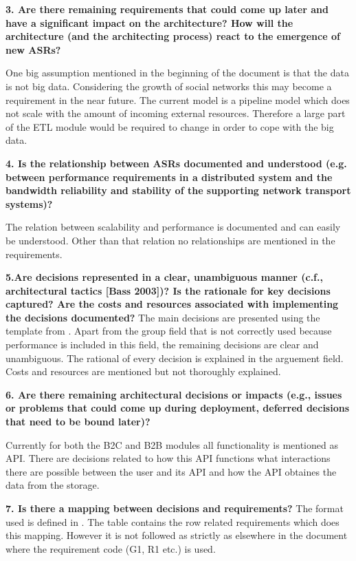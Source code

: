\vspace{.5cm}
\textbf {3. Are there remaining requirements that could come up later and have a significant impact on the architecture? How will the architecture (and the architecting process) react to the emergence of new ASRs? }

One big assumption mentioned in the beginning of the document is that the data is not big data. Considering the growth of social networks this may become a requirement in the near future. The current model is a pipeline model which does not scale with the amount of incoming external resources. Therefore a large part of the ETL module would be required to change in order to cope with the big data. 

\vspace{.5cm}
\textbf {4. Is the relationship between ASRs documented and understood (e.g. between performance requirements in a distributed system and the bandwidth reliability and stability of the supporting network transport systems)?}

The relation between scalability and performance is documented and can easily be understood. Other than that relation no relationships are mentioned in the requirements. 

\vspace{.5cm}
\textbf{5.Are decisions represented in a clear, unambiguous manner (c.f., architectural tactics [Bass 2003])? 
         Is the rationale for key decisions captured?
         Are the costs and resources associated with implementing the decisions documented?}
The main decisions are presented using the template from \cite{}. Apart from the group field that is not correctly used because performance is included in this field, the remaining decisions are clear and unambiguous. The rational of every decision is explained in the arguement field. Costs and resources are mentioned but not thoroughly explained.

\vspace{.5cm}
\textbf {6. Are there remaining architectural decisions or impacts (e.g., issues or problems that could come up during deployment, deferred decisions that need to be bound later)?}

Currently for both the B2C and B2B modules all functionality is mentioned as API. There are decisions related to how this API functions what interactions there are possible between the user and its API and how the API obtaines the data from the storage.

\vspace{.5cm}
\textbf{7. Is there a mapping between decisions and requirements? }
The format used is defined in \cite{tyree}. The table contains the row related requirements which does this mapping. However it is not followed as strictly as elsewhere in the document where the requirement code (G1, R1 etc.) is used. 

